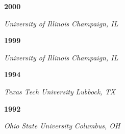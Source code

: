 
 \hfill \textbf{2000}

\textit{University of Illinois} \hfill \textit{Champaign, IL}
\vspace{0.25em}

 \hfill \textbf{1999}

\textit{University of Illinois} \hfill \textit{Champaign, IL}
\vspace{0.25em}

 \hfill \textbf{1994}

\textit{Texas Tech University } \hfill \textit{Lubbock, TX}
\vspace{0.25em}

 \hfill \textbf{1992}

\textit{Ohio State University } \hfill \textit{Columbus, OH}

